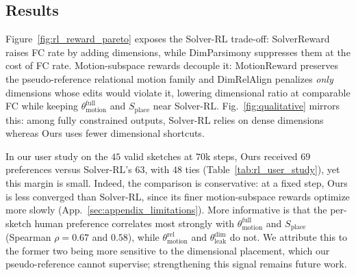 \subsection{Results}
\label{sec:rl_reward_results}
Figure~\ref{fig:rl_reward_pareto} exposes the Solver-RL trade-off: SolverReward raises FC rate by adding dimensions, while DimParsimony suppresses them at the cost of FC rate. Motion-subspace rewards decouple it: MotionReward preserves the pseudo-reference relational motion family and DimRelAlign penalizes \textit{only} dimensions whose edits would violate it, lowering dimensional ratio at comparable FC while keeping $\theta_{\mathrm{motion}}^{\mathrm{full}}$ and $S_\mathrm{place}$ near Solver-RL. Fig.~\ref{fig:qualitative} mirrors this: among fully constrained outputs, Solver-RL relies on dense dimensions whereas Ours uses fewer dimensional shortcuts.

In our user study on the $45$ valid sketches at $70$k steps, Ours received $69$ preferences versus Solver-RL's $63$, with $48$ ties (Table~\ref{tab:rl_user_study}), yet this margin is small. Indeed, the comparison is conservative: at a fixed step, Ours is less converged than Solver-RL, since its finer motion-subspace rewards optimize more slowly (App.~\ref{sec:appendix_limitations}).
More informative is that the per-sketch human preference correlates most strongly with $\theta_\mathrm{motion}^\mathrm{full}$ and $S_\mathrm{place}$ (Spearman $\rho=0.67$ and $0.58$), while $\theta_\mathrm{motion}^\mathrm{rel}$ and $\theta_\mathrm{leak}^\mathrm{dim}$ do not. We attribute this to the former two being more sensitive to the dimensional placement, which our pseudo-reference cannot supervise; strengthening this signal remains future work.
